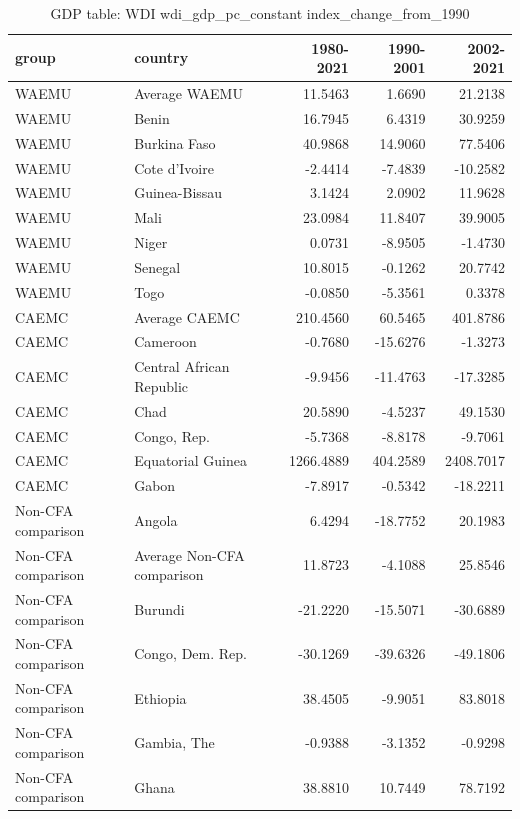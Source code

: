 \begin{table}

\caption{GDP table: WDI wdi_gdp_pc_constant index_change_from_1990}
\centering
\begin{tabular}[t]{llrrr}
\toprule
group & country & 1980-2021 & 1990-2001 & 2002-2021\\
\midrule
WAEMU & Average WAEMU & 11.5463 & 1.6690 & 21.2138\\
WAEMU & Benin & 16.7945 & 6.4319 & 30.9259\\
WAEMU & Burkina Faso & 40.9868 & 14.9060 & 77.5406\\
WAEMU & Cote d'Ivoire & -2.4414 & -7.4839 & -10.2582\\
WAEMU & Guinea-Bissau & 3.1424 & 2.0902 & 11.9628\\
\addlinespace
WAEMU & Mali & 23.0984 & 11.8407 & 39.9005\\
WAEMU & Niger & 0.0731 & -8.9505 & -1.4730\\
WAEMU & Senegal & 10.8015 & -0.1262 & 20.7742\\
WAEMU & Togo & -0.0850 & -5.3561 & 0.3378\\
CAEMC & Average CAEMC & 210.4560 & 60.5465 & 401.8786\\
\addlinespace
CAEMC & Cameroon & -0.7680 & -15.6276 & -1.3273\\
CAEMC & Central African Republic & -9.9456 & -11.4763 & -17.3285\\
CAEMC & Chad & 20.5890 & -4.5237 & 49.1530\\
CAEMC & Congo, Rep. & -5.7368 & -8.8178 & -9.7061\\
CAEMC & Equatorial Guinea & 1266.4889 & 404.2589 & 2408.7017\\
\addlinespace
CAEMC & Gabon & -7.8917 & -0.5342 & -18.2211\\
Non-CFA comparison & Angola & 6.4294 & -18.7752 & 20.1983\\
Non-CFA comparison & Average Non-CFA comparison & 11.8723 & -4.1088 & 25.8546\\
Non-CFA comparison & Burundi & -21.2220 & -15.5071 & -30.6889\\
Non-CFA comparison & Congo, Dem. Rep. & -30.1269 & -39.6326 & -49.1806\\
\addlinespace
Non-CFA comparison & Ethiopia & 38.4505 & -9.9051 & 83.8018\\
Non-CFA comparison & Gambia, The & -0.9388 & -3.1352 & -0.9298\\
Non-CFA comparison & Ghana & 38.8810 & 10.7449 & 78.7192\\

\end{tabular}
\end{table}
